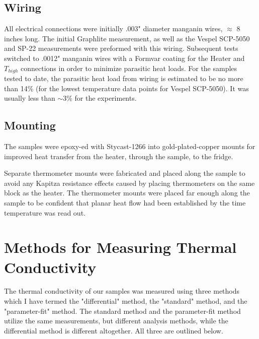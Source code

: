 \documentclass{report}
\begin{document}
\subsection{Wiring}
All electrical connections were initially .003" diameter manganin wires, $\approx$ 8 inches long. The initial Graphlite measurement, as well as the Vespel SCP-5050 and SP-22 measurements were preformed with this wiring. Subsequent tests switched to .0012" manganin wires with a Formvar coating for the Heater and $T_{high}$ connections in order to minimize parasitic heat loads. For the samples tested to date, the parasitic heat load from wiring is estimated to be no more than 14\% (for the lowest temperature data points for Vespel SCP-5050). It was usually less than $\sim$3\% for the experiments.  

\subsection{Mounting}
The samples were epoxy-ed with Stycast-1266 into gold-plated-copper mounts for improved heat transfer from the heater, through the sample, to the fridge.

Separate thermometer mounts were fabricated and placed along the sample to avoid any Kapitza resistance effects caused by placing thermometers on the same block as the heater. The thermometer mounts were placed far enough along the sample to be confident that planar heat flow had been established by the time temperature was read out.

\section{Methods for Measuring Thermal Conductivity}
The thermal conductivity of our samples was measured using three methods which I have termed the "differential" method, the "standard" method, and the "parameter-fit" method. The standard method and the parameter-fit method utilize the same measurements, but different analysis methods, while the differential method is different altogether. All three are outlined below.
\end{document}
